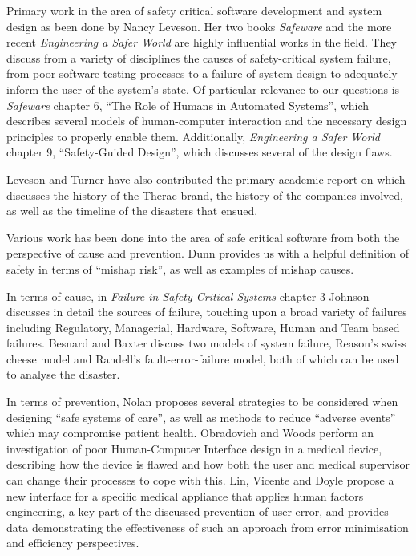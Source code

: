 \documentclass{cshonours}
\begin{document}
Primary work in the area of safety critical software development and system design as been done by Nancy Leveson. Her two books \textit{Safeware} \cite{safeware} and the more recent \textit{Engineering a Safer World} \cite{saferworld} are highly influential works in the field. They discuss from a variety of disciplines the causes of safety-critical system failure, from poor software testing processes to a failure of system design to adequately inform the user of the system's state. Of particular relevance to our \ther questions is \textit{Safeware} chapter 6, ``The Role of Humans in Automated Systems'', which describes several models of human-computer interaction and the necessary design principles to properly enable them. Additionally, \textit{Engineering a Safer World} chapter 9, ``Safety-Guided Design'', which discusses several of the \ther design flaws.

Leveson and Turner have also contributed the primary academic report on \ther \cite{leveson1993investigation} which discusses the history of the Therac brand, the history of the companies involved, as well as the timeline of the disasters that ensued.

Various work has been done into the area of safe critical software from both the perspective of cause and prevention. Dunn \cite{dunn2003designing} provides us with a helpful definition of safety in terms of ``mishap risk'', as well as examples of mishap causes.

In terms of cause, in \textit{Failure in Safety-Critical Systems} chapter 3 \cite{johnson2003failure} Johnson discusses in detail the sources of failure, touching upon a broad variety of failures including Regulatory, Managerial, Hardware, Software, Human and Team based failures. Besnard and Baxter \etal \cite{besnard2003human} discuss two models of system failure, Reason's swiss cheese model and Randell's fault-error-failure model, both of which can be used to analyse the \ther disaster.

In terms of prevention, Nolan \cite{nolan2000system} proposes several strategies to be considered when designing ``safe systems of care'', as well as methods to reduce ``adverse events''  which may compromise patient health. Obradovich and Woods \cite{obradovich1996users} perform an investigation of poor Human-Computer Interface design in a medical device, describing how the device is flawed and how both the user and medical supervisor can change their processes to cope with this. Lin, Vicente and Doyle \cite{lin2001patient} propose a new interface for a specific medical appliance that applies human factors engineering, a key part of the discussed prevention of user error, and provides data demonstrating the effectiveness of such an approach from error minimisation and efficiency perspectives.
\end{document}
